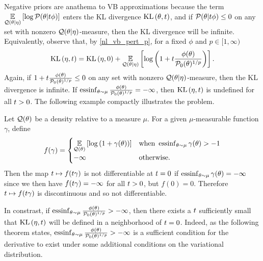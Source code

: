 Negative priors are anathema to VB approximations because the term
$\underset{\mathcal{Q}(\theta \vert \eta)}{\mathbb{E}}\left[\log \mathcal{P}(\theta \vert t \phi)\right]$ enters the KL
divergence $\mathrm{KL}\left(\theta, t\right)$, and if $\mathcal{P}(\theta \vert t \phi) \le 0$ on any set
with nonzero $\mathcal{Q}(\theta \vert \eta)$-measure, then the KL divergence will be
infinite.  Equivalently, observe that, by \eqref{nl_vb_pert_p}, for a fixed
$\phi$ and $p \in [1, \infty)$
%
\begin{align*}
%
\KL{\eta, \t} = \KL{\eta, 0} +
\expect{\q(\theta \vert \eta)}
       {\log\left(1 + \t \frac{\phi(\theta)}{\pbase(\theta)^{1/p}}\right)}.
%
\end{align*}
%
Again, if $1 + t \frac{\phi(\theta)}{\mathcal{P}_{0}(\theta)^{1/p}} \le 0$ on any set
with nonzero $\mathcal{Q}(\theta \vert \eta)$-measure, then the KL divergence is
infinite.  If $\operatorname*{\mathrm{essinf}}_{\theta \sim
\mu}\frac{\phi(\theta)}{\mathcal{P}_{0}(\theta)^{1/p}} = -\infty$, then $\mathrm{KL}\left(\eta, t\right)$
is undefined for all $t > 0$.  The following example compactly illustrates
the problem.

\begin{ex}
%
Let $\mathcal{Q}(\theta)$ be a density relative to a measure $\mu$. For a given
$\mu$-measurable function $\gamma$, define
%
\begin{align*}
%
f(\gamma) = \begin{cases}
\expect{\q(\theta)}{\log\left(1 + \gamma(\theta)\right)}
    & \textrm{when }\essinf_{\theta \sim \mu} \gamma(\theta) > -1 \\
-\infty & \textrm{otherwise}.
\end{cases}
%
\end{align*}
%
Then the map $t \mapsto f(t \gamma)$ is not differentiable at $t=0$ if
$\operatorname*{\mathrm{essinf}}_{\theta \sim \mu} \gamma(\theta) = -\infty$ since we then have $f (t
\gamma) = -\infty$ for all $t > 0$, but $f(0) = 0$.  Therefore $t \mapsto f(t
\gamma)$ is discontinuous and so not differentiable.
%
\end{ex}

In constrast, if $\operatorname*{\mathrm{essinf}}_{\theta \sim
\mu}\frac{\phi(\theta)}{\mathcal{P}_{0}(\theta)^{1/p}} > -\infty$, then there exists a
$t$ sufficiently small that $\mathrm{KL}\left(\eta, t\right)$ will be defined in a neighborhood
of $t = 0$. Indeed, as the following theorem states, $\operatorname*{\mathrm{essinf}}_{\theta \sim
\mu}\frac{\phi(\theta)}{\mathcal{P}_{0}(\theta)^{1/p}} > -\infty$ is a sufficient
condition for the derivative to exist under some additional conditions on the
variational distribution.


